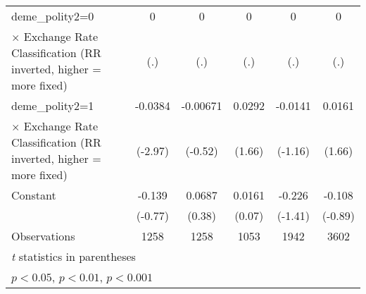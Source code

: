 {\begin{tabular}{l*{5}{c}}
\addlinespace
deme\_polity2=0  &        0         &        0         &        0         &        0         &        0         \\
$\times$ Exchange Rate Classification (RR inverted, higher = more fixed)&      (.)         &      (.)         &      (.)         &      (.)         &      (.)         \\
\addlinespace
deme\_polity2=1  &  -0.0384\sym{**} & -0.00671         &   0.0292         &  -0.0141         &   0.0161         \\
$\times$ Exchange Rate Classification (RR inverted, higher = more fixed)&  (-2.97)         &  (-0.52)         &   (1.66)         &  (-1.16)         &   (1.66)         \\
\addlinespace
Constant        &   -0.139         &   0.0687         &   0.0161         &   -0.226         &   -0.108         \\
                &  (-0.77)         &   (0.38)         &   (0.07)         &  (-1.41)         &  (-0.89)         \\
\midrule
Observations    &     1258         &     1258         &     1053         &     1942         &     3602         \\
\bottomrule
\multicolumn{6}{l}{\footnotesize \textit{t} statistics in parentheses}\\
\multicolumn{6}{l}{\footnotesize \sym{*} \(p<0.05\), \sym{**} \(p<0.01\), \sym{***} \(p<0.001\)}\\
\end{tabular}
}
